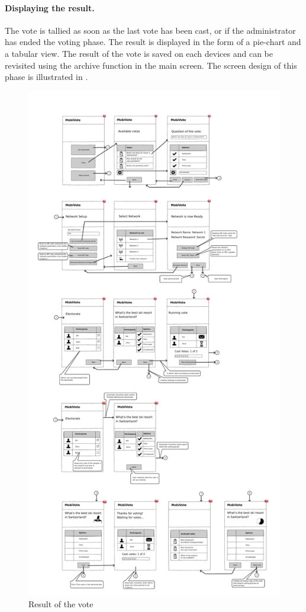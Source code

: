 \documentclass[numbers=noenddot, abstract=on, a4paper, headsepline,
footsepline, oneside, draft=off]{scrreprt}
\begin{document}
\paragraph{Displaying the result.}
The vote is tallied as soon as the last vote has been cast, or if the
administrator has ended the voting phase. The result is displayed in the form of
a pie-chart and a tabular view. The result of the vote is saved on each devices
and can be revisited using the archive function in the main screen. The screen
design of this phase is illustrated in .

\begin{figure}[htb]
	\centering
	\includegraphics[height=.4\textheight]{img/storyboard/result}
	\caption{Result of the vote}
	\label{fig:result}
\end{figure}
\end{document}
